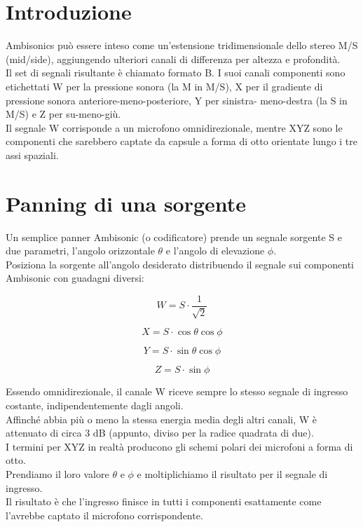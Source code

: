   \section{Introduzione}
Ambisonics può essere inteso come un'estensione tridimensionale dello stereo M/S (mid/side),
aggiungendo ulteriori canali di differenza per altezza e profondità.\\
Il set di segnali risultante è chiamato formato B.
I suoi canali componenti sono etichettati W per la pressione sonora (la M in M/S),
X per il gradiente di pressione sonora anteriore-meno-posteriore, 
Y per sinistra- meno-destra (la S in M/S) e Z per su-meno-giù. \\
Il segnale W corrisponde a un microfono omnidirezionale,
mentre XYZ sono le componenti che sarebbero captate da
capsule a forma di otto orientate lungo i tre assi spaziali.

\section{Panning di una sorgente}
Un semplice panner Ambisonic (o codificatore) prende un segnale sorgente S e due parametri,
 l'angolo orizzontale $\theta$ e l'angolo di elevazione $\phi$.\\
 Posiziona la sorgente all'angolo desiderato distribuendo il segnale sui 
 componenti Ambisonic con guadagni diversi:

 \begin{equation}
W =S\cdot\frac{1}{\sqrt{2}}
 \end{equation}

 \begin{equation}
      X=S\cdot\cos\theta\cos\phi
\end{equation}

\begin{equation}
      Y =S\cdot\sin\theta\cos\phi
\end{equation}

\begin{equation}
      Z=S\cdot\sin\phi
\end{equation}

Essendo omnidirezionale, il canale W riceve sempre lo stesso segnale di ingresso costante, indipendentemente dagli angoli. \\
Affinché abbia più o meno la stessa energia media degli altri canali, W è attenuato di circa 3 dB (appunto, diviso per la radice quadrata di due).\\
 I termini per XYZ in realtà producono gli schemi polari dei microfoni a forma di otto. \\ 
 Prendiamo il loro valore $\theta$ e $\phi$ e moltiplichiamo il risultato per il segnale di ingresso.\\
  Il risultato è che l'ingresso finisce in tutti i componenti esattamente come l'avrebbe captato il microfono corrispondente.
\\

